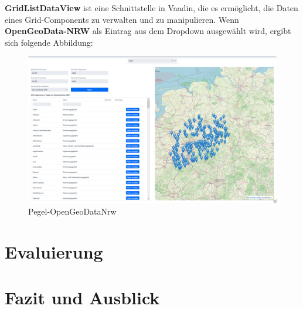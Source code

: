 \documentclass[a4paper,12pt]{scrreprt}
\begin{document}
\textbf{GridListDataView} ist eine Schnittstelle in Vaadin, die es ermöglicht, die Daten eines Grid-Components zu verwalten und zu manipulieren.
\clearpage
Wenn \textbf{OpenGeoData-NRW} als Eintrag aus dem Dropdown ausgewählt wird, ergibt sich folgende Abbildung:
\begin{figure}[H]
	\centering
	\includegraphics[width=18cm]{pegel-opengeodata.png}
	\caption{\label{pegel:}Pegel-OpenGeoDataNrw}
\end{figure}



\chapter{Evaluierung}
	
\chapter{Fazit und Ausblick}
	
\printbibliography
\end{document}
